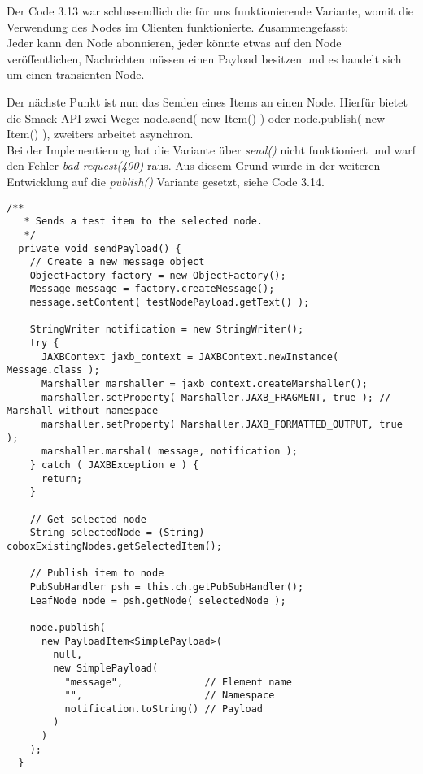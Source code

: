 Der Code 3.13 war schlussendlich die für uns funktionierende Variante, womit die Verwendung des Nodes im Clienten funktionierte. Zusammengefasst:\\

Jeder kann den Node abonnieren, jeder könnte etwas auf den Node veröffentlichen, Nachrichten müssen einen Payload besitzen und es handelt sich um einen transienten Node.

\vspace{0.2cm}

Der nächste Punkt ist nun das Senden eines Items an einen Node. Hierfür bietet die Smack API zwei Wege: \textsf{node.send( new Item() )} oder \textsf{node.publish( new Item() )}, zweiters arbeitet asynchron.\\
Bei der Implementierung hat die Variante über \textit{send()} nicht funktioniert und warf den Fehler \textit{bad-request(400)} raus. Aus diesem Grund wurde in der weiteren Entwicklung auf die \textit{publish()} Variante gesetzt, siehe Code 3.14.

\begin{lstlisting}[label=xmppnodepayload,caption=Auszug aus XMPP Client für das Senden eines Items mit einem JAXB Objekt als Payload]
/**
   * Sends a test item to the selected node.
   */
  private void sendPayload() {
    // Create a new message object
    ObjectFactory factory = new ObjectFactory();
    Message message = factory.createMessage();
    message.setContent( testNodePayload.getText() );

    StringWriter notification = new StringWriter();
    try {
      JAXBContext jaxb_context = JAXBContext.newInstance( Message.class );
      Marshaller marshaller = jaxb_context.createMarshaller();
      marshaller.setProperty( Marshaller.JAXB_FRAGMENT, true ); // Marshall without namespace
      marshaller.setProperty( Marshaller.JAXB_FORMATTED_OUTPUT, true );
      marshaller.marshal( message, notification );
    } catch ( JAXBException e ) {
      return;
    }

    // Get selected node
    String selectedNode = (String) coboxExistingNodes.getSelectedItem();

    // Publish item to node
    PubSubHandler psh = this.ch.getPubSubHandler();
    LeafNode node = psh.getNode( selectedNode );

    node.publish(
      new PayloadItem<SimplePayload>(
        null,
        new SimplePayload(
          "message",              // Element name
          "",                     // Namespace
          notification.toString() // Payload
        )
      )
    );
  }
\end{lstlisting}


